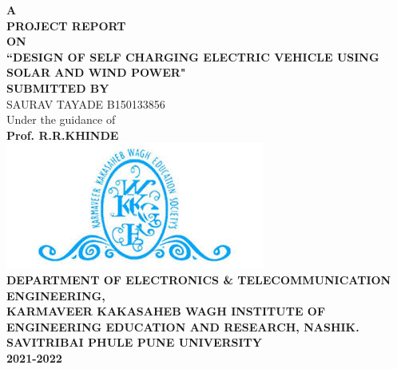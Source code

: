\documentclass[a4paper,12pt]{article}
\begin{document}
\begin{center}
\Large\textbf{\scshape A}\\
\Large\textbf{\scshape PROJECT REPORT}\\
\Large\textbf{\scshape ON}\\[1.5cm]
\vspace{0.1in}
\LARGE\textbf{“DESIGN OF SELF CHARGING ELECTRIC VEHICLE USING SOLAR AND WIND POWER"}\\[1.5cm]
\large\textbf{SUBMITTED BY}\\[1cm] 
SAURAV TAYADE \hspace{8cm} B150133856\\[1cm]
Under the guidance of\\[0.16cm]
\Large\textbf{Prof. R.R.KHINDE}\\[0.5cm]
\includegraphics[scale=0.5]{logo.jpg}\\
\Large\textbf{\scshape DEPARTMENT OF ELECTRONICS \& TELECOMMUNICATION ENGINEERING,}\\[0.75cm]
\Large\scshape\textbf{\scshape KARMAVEER KAKASAHEB WAGH INSTITUTE OF ENGINEERING EDUCATION AND RESEARCH, NASHIK.}\\[0.75cm]
\Large\textbf{\scshape SAVITRIBAI PHULE PUNE UNIVERSITY}\\[0.75cm]
\Large\textbf{\scshape 2021-2022}\\
\end{center}
\end{document}
